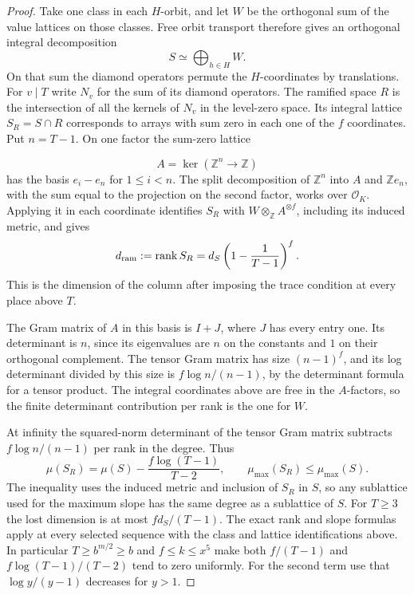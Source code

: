 \begin{proof}
Take one class in each \(H\)-orbit, and let \(W\) be the
orthogonal sum of the value lattices on those classes.
Free orbit transport therefore gives an orthogonal integral decomposition
\[
  S\simeq\bigoplus_{h\in H}W.
\]
 On that sum the
diamond operators permute the \(H\)-coordinates by
translations. For \(v\mid T\) write \(N_v\) for the sum
of its diamond operators. The ramified space \(R\) is the
intersection of all the kernels of \(N_v\) in the level-zero
space. Its integral lattice \(S_R=S\cap R\) corresponds to
arrays with sum zero in each one of the \(f\) coordinates.
Put \(n=T-1\). On one factor the sum-zero lattice

\[
  A=\ker(\mathbb Z^n\to\mathbb Z)
\]
 has the basis \(e_i-e_n\) for
\(1\le i<n\). The split decomposition of \(\mathbb Z^n\) into
\(A\) and \(\mathbb Z e_n\), with the sum equal to the projection
on the second factor, works over \(\mathcal O_K\).
Applying it in each coordinate identifies \(S_R\) with
\(W\otimes_{\mathbb Z} A^{\otimes f}\), including its induced
metric, and gives
\begin{equation}\label{eq:ramified-rank}
        d_{\rm ram}:=\operatorname{rank} S_R
           =d_S\left(1-\frac1{T-1}\right)^f .
\end{equation}
This is the dimension of the column after imposing the trace
condition at every place above \(T\).

The Gram matrix of \(A\) in this basis is \(I+J\), where
\(J\) has every entry one. Its determinant is \(n\), since
its eigenvalues are \(n\) on the constants and \(1\) on
their orthogonal complement. The tensor Gram matrix has
size \((n-1)^f\), and its log determinant divided by this
size is \(f\log n/(n-1)\), by the determinant formula for
a tensor product. The integral coordinates above are
free in the \(A\)-factors, so the finite determinant
contribution per rank is the one for \(W\).

At infinity
the squared-norm determinant of the tensor Gram matrix
subtracts \(f\log n/(n-1)\) per rank in the degree. Thus
\begin{equation}\label{eq:ramified-slope}
        \mu(S_R)=\mu(S)-\frac{f\log(T-1)}{T-2},\qquad
        \mu_{\max}(S_R)\le\mu_{\max}(S).
\end{equation}
The inequality uses the induced metric and inclusion of
\(S_R\) in \(S\), so any sublattice used for the maximum
slope has the same degree as a sublattice of \(S\).
For \(T\ge3\) the lost dimension is at most \(f d_S/(T-1)\).
The exact rank and slope formulas apply at every selected sequence with the class and lattice identifications above.
In particular \(T\ge b^{m/2}\ge b\) and
\(f\le k\le x^5\) make both \(f/(T-1)\) and
\(f\log(T-1)/(T-2)\) tend to zero uniformly. For the
second term use that \(\log y/(y-1)\) decreases for \(y>1\).
\end{proof}

